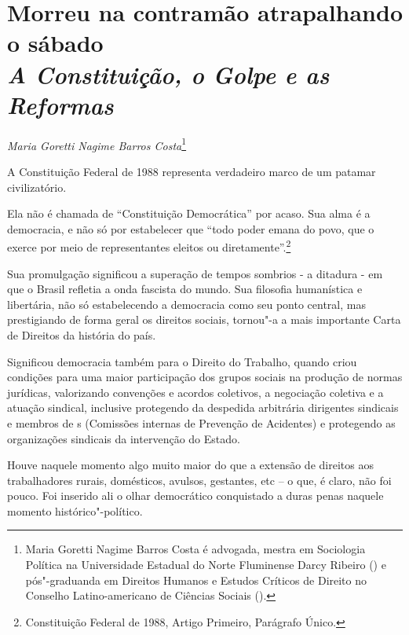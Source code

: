 \chapter*{Morreu na contramão atrapalhando o sábado\\
\emph{A Constituição, o Golpe e as Reformas}}


\begin{flushright}
\emph{Maria Goretti Nagime Barros Costa}\footnote{Maria Goretti
Nagime Barros Costa é advogada, mestra em
Sociologia Política na Universidade Estadual do Norte Fluminense Darcy
Ribeiro () e pós"-graduanda em Direitos Humanos e Estudos Críticos de
Direito no Conselho Latino-americano de Ciências Sociais ().}
\end{flushright}

A Constituição Federal de 1988 representa verdadeiro marco de um patamar
civilizatório.

Ela não é chamada de ``Constituição Democrática'' por acaso. Sua alma é
a democracia, e não só por estabelecer que ``todo poder emana do povo,
que o exerce por meio de representantes eleitos ou
diretamente''.\footnote{Constituição Federal de 1988, Artigo Primeiro,
  Parágrafo Único.}

Sua promulgação significou a superação de tempos sombrios - a ditadura -
em que o Brasil refletia a onda fascista do mundo. Sua filosofia
humanística e libertária, não só estabelecendo a democracia como seu
ponto central, mas prestigiando de forma geral os direitos sociais,
tornou"-a a mais importante Carta de Direitos da história do país.

Significou democracia também para o Direito do Trabalho, quando criou
condições para uma maior participação dos grupos sociais na produção de
normas jurídicas, valorizando convenções e acordos coletivos, a
negociação coletiva e a atuação sindical, inclusive protegendo da
despedida arbitrária dirigentes sindicais e membros de s (Comissões
internas de Prevenção de Acidentes) e protegendo as organizações
sindicais da intervenção do Estado.

Houve naquele momento algo muito maior do que a extensão de direitos aos
trabalhadores rurais, domésticos, avulsos, gestantes, etc -- o que, é
claro, não foi pouco. Foi inserido ali o olhar democrático conquistado a
duras penas naquele momento histórico"-político.

